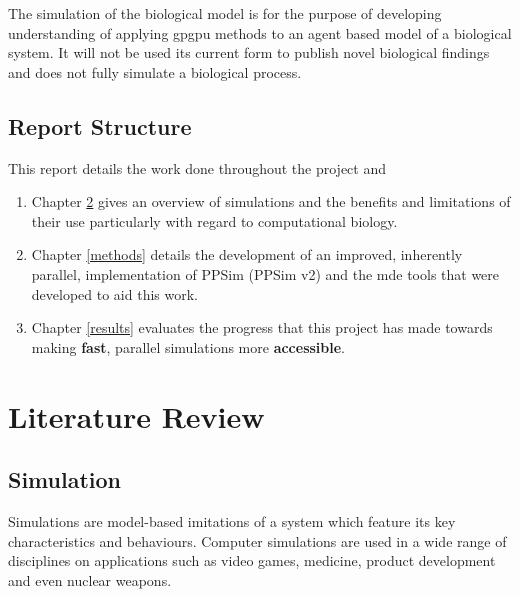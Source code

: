 \documentclass{UoYCSproject}
\begin{document}
The simulation of the biological model is for the purpose of developing understanding of applying \gls{gpgpu} methods to an agent based model of a biological system. It will not be used its current form to publish novel biological findings and does not fully simulate a biological process.%


\section{Report Structure}
This report details the work done throughout the project and 

\begin{enumerate}
    \item Chapter \ref{lit_review} gives an overview of simulations and the benefits and limitations of their use particularly with regard to computational biology.
    \item Chapter \ref{methods} details the development of an improved, inherently parallel, implementation of PPSim (PPSim v2) and the \gls{mde} tools that were developed to aid this work.
    \item Chapter \ref{results} evaluates the progress that this project has made towards making \textbf{fast}, parallel simulations more \textbf{accessible}.
\end{enumerate}

\chapter{Literature Review}
\label{lit_review}
%

\section{Simulation}
\label{simulation}
Simulations are model-based imitations of a system which feature its key characteristics and behaviours. Computer simulations are used in a wide range of disciplines on applications such as video games, medicine, product development and even nuclear weapons.
\end{document}
